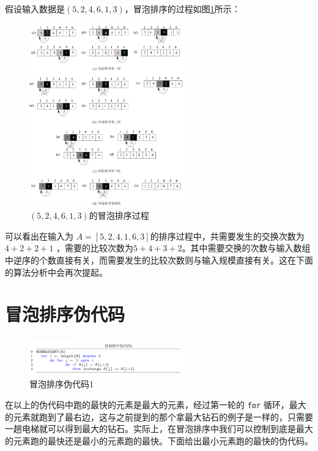 \documentclass[10pt,a4paper,UTF8]{article}
\begin{document}
假设输入数据是\((5,2,4,6,1,3)\)，冒泡排序的过程如图\ref{fig:orgf0e601c}所示：
\begin{figure}[htbp]
\centering
\includegraphics[width=0.6\textwidth]{../../img/computer_algorithms/20170702bubbleSort.png}
\caption{\label{fig:orgf0e601c}
\((5,2,4,6,1,3)\)的冒泡排序过程}
\end{figure}

可以看出在输入为 \(A=[5,2,4,1,6,3]\)的排序过程中，共需要发生的交换次数为 \(4+2+2+1\) ，需要的比较次数为\(5+4+3+2\)。其中需要交换的次数与输入数组中逆序的个数直接有关，而需要发生的比较次数则与输入规模直接有关。这在下面的算法分析中会再次提起。
\section{冒泡排序伪代码}
\label{sec:org1bc7566}


\begin{figure}[htbp]
\centering
\includegraphics[width=0.6\textwidth]{../../img/computer_algorithms/20170702bubbleSortPseudoCode1.png}
\caption{\label{fig:orga2c8d80}
冒泡排序伪代码1}
\end{figure}

在以上的伪代码中跑的最快的元素是最大的元素，经过第一轮的 \texttt{for} 循环，最大的元素就跑到了最右边，这与之前提到的那个拿最大钻石的例子是一样的，只需要一趟电梯就可以得到最大的钻石。实际上，在冒泡排序中我们可以控制到底是最大的元素跑的最快还是最小的元素跑的最快。下面给出最小元素跑的最快的伪代码。
\end{document}
